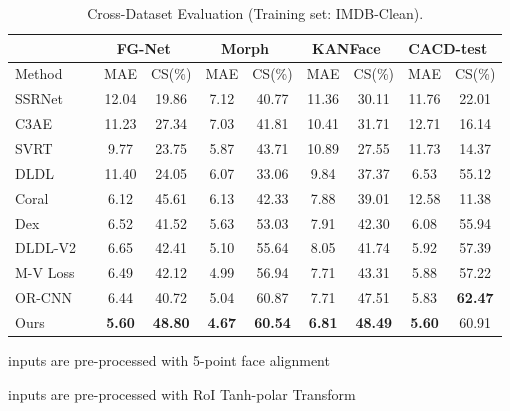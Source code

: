 \begin{table*}[ht] 
	\caption{Cross-Dataset Evaluation (Training set: IMDB-Clean).}\label{tab:cross-db-res}
	\begin{center}
    		\begin{threeparttable}
		\begin{tabular}{l|c|c|c|c|c|c|c|c}
    		\toprule
            & \multicolumn{2}{c|}{FG-Net~\cite{fgnet2002}} 
            & \multicolumn{2}{c|}{Morph~\cite{ricanekMORPHLongitudinalImage2006}} 
            &
            \multicolumn{2}{c|}{KANFace~\cite{georgopoulosInvestigatingBiasDeep2020}} & \multicolumn{2}{c}{CACD-test~\cite{chenFaceRecognitionRetrieval2015}}
			\\ 
			\midrule \hline
            Method & MAE & CS(\%) & MAE & CS(\%) & MAE & CS(\%) 
            & MAE & CS(\%) 
            \\ 
            \hline 
			SSRNet\tnote{}~~\cite{ssrnet2018} & 12.04 & 19.86 & 7.12 & 40.77 & 11.36 & 30.11 & 11.76&22.01 
			\\
			C3AE\tnote{}~~\cite{zhangC3AEExploringLimits2019} & 11.23 
			& 27.34 
			& 7.03 
			& 41.81
			& 10.41
			& 31.71
			& 12.71
			& 16.14
			\\
			SVRT\tnote{}~~\cite{imScaleVaryingTripletRanking2019} & 9.77 & 23.75 & 5.87 &43.71 &10.89 & 27.55 & 11.73 & 14.37 
			\\
			DLDL\tnote{}~~\cite{gaoDeepLabelDistribution2017}  & 11.40 & 24.05 &6.07 & 33.06 & 9.84 &37.37 &6.53 &  55.12 
\\
			Coral\tnote{}~~\cite{Cao2020coral}    
			& 6.12
			& 45.61
			& 6.13
			& 42.33
			& 7.88
			& 39.01
			& 12.58
			& 11.38
			\\
			Dex\tnote{}~~\cite{rotheDeepExpectationReal2018}  & 6.52 & 41.52 &  5.63 & 53.03 & 7.91 & 42.30 & 6.08 & 55.94 
			\\
			DLDL-V2\tnote{}~~\cite{gaoAgeEstimationUsing2018}   & 6.65 & 42.41  & 5.10 & 55.64 &8.05 & 41.74  & 5.92 & 57.39 
			\\
			M-V Loss\tnote{}~~\cite{panMeanVarianceLossDeep2018}   & 6.49  & 42.12  &4.99 &56.94 & 7.71 & 43.31 & 5.88 & 57.22 
			\\
			OR-CNN\tnote{}~~\cite{niuOrdinalRegressionMultiple2016} 
			& 6.44
			& 40.72
			&  5.04
			& 60.87
			& 7.71
			& 47.51
			& 5.83
			& \textbf{62.47}
			\\
			\hline
			Ours\tnote{}   & \textbf{5.60} &  \textbf{48.80} & \textbf{4.67} & \textbf{60.54} & \textbf{6.81} & \textbf{48.49} & \textbf{5.60} & 60.91 \\ \bottomrule

		\end{tabular}
    	\begin{tablenotes}
    	\item  inputs are pre-processed with 5-point face alignment 
    	\item  inputs are pre-processed with RoI Tanh-polar Transform~\cite{linRoITanhpolarTransformer2021}
    	\end{tablenotes}
	\end{threeparttable}

	\end{center}
\end{table*}


